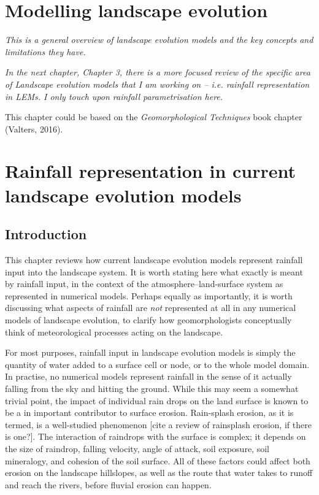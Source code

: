 \documentclass[12pt,oneside,PhD]{muthesis}
\begin{document}
\chapter{Modelling landscape evolution}
\textit{This is a general overview of landscape evolution models and the key concepts and limitations they have. }

\textit{In the next chapter, Chapter 3, there is a more focused review of the specific area of Landscape evolution models that I am working on -- i.e. rainfall representation in LEMs. I only touch upon rainfall parametrisation here.}

This chapter could be based on the \textit{Geomorphological Techniques} book chapter (Valters, 2016).

\chapter{Rainfall representation in current landscape evolution models}

\section{Introduction}
This chapter reviews how current landscape evolution models represent rainfall input into the landscape system. It is worth stating here what exactly is meant by rainfall input, in the context of the atmosphere--land-surface system as represented in numerical models. Perhaps equally as importantly, it is worth discussing what aspects of rainfall are \textit{not} represented at all in any numerical models of landscape evolution, to clarify how geomorphologists conceptually think of meteorological processes acting on the landscape.

For most purposes, rainfall input in landscape evolution models is simply the quantity of water added to a surface cell or node, or to the whole model domain. In practise, no numerical models represent rainfall in the sense of it actually falling from the sky and hitting the ground. While this may seem a somewhat trivial point, the impact of individual rain drops on the land surface is known to be a in important contributor to surface erosion. Rain-splash erosion, as it is termed, is a well-studied phenomenon [cite a review of rainsplash erosion, if there is one?]. The interaction of raindrops with the surface is complex; it depends on the size of raindrop, falling velocity, angle of attack, soil exposure, soil mineralogy, and cohesion of the soil surface. All of these factors could affect both erosion on the landscape hillslopes, as well as the route that water takes to runoff and reach the rivers, before fluvial erosion can happen.
\end{document}
